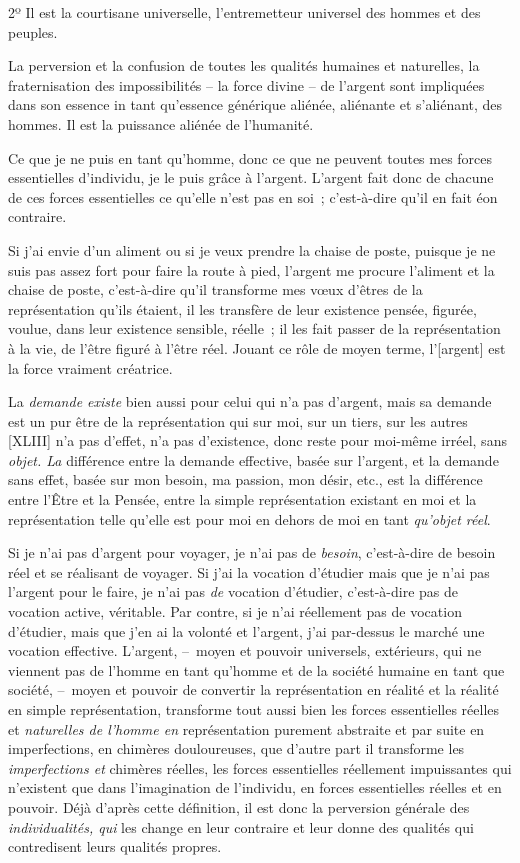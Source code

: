 \documentclass[french,twoside]{book} %
\begin{document}
2º Il est la courtisane universelle, l’entremetteur universel des hommes et des peuples.\par
La perversion et la confusion de toutes les qualités humaines et naturelles, la fraternisation des impossibilités – la force divine – de l’argent sont impliquées dans son essence in tant qu’essence générique aliénée, aliénante et s’aliénant, des hommes. Il est la puissance aliénée de l’humanité.\par
Ce que je ne puis en tant qu’homme, donc ce que ne peuvent toutes mes forces essentielles d’individu, je le puis grâce à l’argent. L’argent fait donc de chacune de ces forces essentielles ce qu’elle n’est pas en soi ; c’est-à-dire qu’il en fait éon contraire.\par
Si j’ai envie d’un aliment ou si je veux prendre la chaise de poste, puisque je ne suis pas assez fort pour faire la route à pied, l’argent me procure l’aliment et la chaise de poste, c’est-à-dire qu’il transforme mes vœux d’êtres de la représentation qu’ils étaient, il les transfère de leur existence pensée, figurée, voulue, dans leur existence sensible, réelle ; il les fait passer de la représentation à la vie, de l’être figuré à l’être réel. Jouant ce rôle de moyen terme, l’[argent] est la force vraiment créatrice.\par
La \emph{demande existe} bien aussi pour celui qui n’a pas d’argent, mais sa demande est un pur être de la représentation qui sur moi, sur un tiers, sur les autres [XLIII] n’a pas d’effet, n’a pas d’existence, donc reste pour moi-même irréel, sans \emph{objet. La} différence entre la demande effective, basée sur l’argent, et la demande sans effet, basée sur mon besoin, ma passion, mon désir, etc., est la différence entre l’Être et la Pensée, entre la simple représentation existant en moi et la représentation telle qu’elle est pour moi en dehors de moi en tant \emph{qu’objet réel}.\par
Si je n’ai pas d’argent pour voyager, je n’ai pas de \emph{besoin}, c’est-à-dire de besoin réel et se réalisant de voyager. Si j’ai la vocation d’étudier mais que je n’ai pas l’argent pour le faire, je n’ai pas \emph{de} vocation d’étudier, c’est-à-dire pas de vocation active, véritable. Par contre, si je n’ai réellement pas de vocation d’étudier, mais que j’en ai la volonté et l’argent, j’ai par-dessus le marché une vocation effective. L’argent, – moyen et pouvoir universels, extérieurs, qui ne viennent pas de l’homme en tant qu’homme et de la société humaine en tant que société, – moyen et pouvoir de convertir la représentation en réalité et la réalité en simple représentation, transforme tout aussi bien les forces essentielles réelles et \emph{naturelles de l’homme en} représentation purement abstraite et par suite en imperfections, en chimères douloureuses, que d’autre part il transforme les \emph{imperfections et} chimères réelles, les forces essentielles réellement impuissantes qui n’existent que dans l’imagination de l’individu, en forces essentielles réelles et en pouvoir. Déjà d’après cette définition, il est donc la perversion générale des \emph{individualités, qui} les change en leur contraire et leur donne des qualités qui contredisent leurs qualités propres.\par
\end{document}
